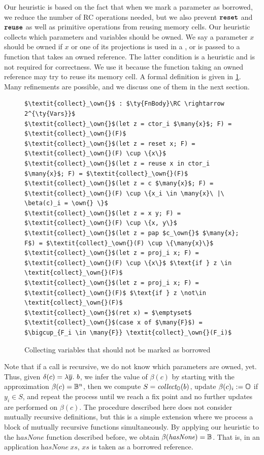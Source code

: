 Our heuristic is based on the fact that when we mark a parameter as
borrowed, we reduce the number of RC operations needed, but we
also prevent $\texttt{\textbf{reset}}$ and $\texttt{\textbf{reuse}}$ as well as primitive
operations from reusing memory cells.  Our heuristic collects which
parameters and variables should be owned.  We say a parameter $x$
should be owned if $x$ or one of its projections is used in a
, or is passed to a function that takes an owned reference.
The latter condition is a heuristic and is not required for
correctness.  We use it because the function taking an owned reference
may try to reuse its memory cell.  A formal definition is given in
\cref{fig:collect_O}. Many refinements are possible, and we
discuss one of them in the next section.
\begin{figure}
\begin{lstlisting}
$\textit{collect}_\own{}$ : $\ty{FnBody}\RC \rightarrow 2^{\ty{Vars}}$
$\textit{collect}_\own{}$(let z = ctor_i $\many{x}$; F) = $\textit{collect}_\own{}(F)$
$\textit{collect}_\own{}$(let z = reset x; F) = $\textit{collect}_\own{}(F) \cup \{x\}$
$\textit{collect}_\own{}$(let z = reuse x in ctor_i $\many{x}$; F) = $\textit{collect}_\own{}(F)$
$\textit{collect}_\own{}$(let z = c $\many{x}$; F) = $\textit{collect}_\own{}(F) \cup \{x_i \in \many{x}\ |\ \beta(c)_i = \own{} \}$
$\textit{collect}_\own{}$(let z = x y; F) = $\textit{collect}_\own{}(F) \cup \{x, y\}$
$\textit{collect}_\own{}$(let z = pap $c_\own{}$ $\many{x}; F$) = $\textit{collect}_\own{}(F) \cup \{\many{x}\}$
$\textit{collect}_\own{}$(let z = proj_i x; F) = $\textit{collect}_\own{}(F) \cup \{x\}$ $\text{if } z \in \textit{collect}_\own{}(F)$
$\textit{collect}_\own{}$(let z = proj_i x; F) = $\textit{collect}_\own{}(F)$ $\text{if } z \not\in \textit{collect}_\own{}(F)$
$\textit{collect}_\own{}$(ret x) = $\emptyset$
$\textit{collect}_\own{}$(case x of $\many{F}$) = $\bigcup_{F_i \in \many{F}} \textit{collect}_\own{}(F_i)$
\end{lstlisting}
\caption{Collecting variables that should not be marked as borrowed\label{fig:collect_O}}
\end{figure}
Note that if a call is recursive, we do not know which parameters are owned, yet. Thus, given
$\delta(c) = \lambda \overline{y}.\ b$, we infer the value of $\beta(c)$ by starting
with the approximation $\beta(c) = \mathbb{B}{}^n$, then we compute $S = \textit{collect}_{\mathbb{O}}{}(b)$,
update $\beta(c)_i := \mathbb{O}{}$ if $y_i \in S$, and
repeat the process until we reach a fix point and no further updates
are performed on $\beta(c)$. The procedure described here does not
consider mutually recursive definitions, but this is a simple
extension where we process a block of mutually recursive functions
simultaneously.
By applying our heuristic to the $\textit{hasNone}$ function described before, we obtain $\beta(\textit{hasNone}) = \mathbb{B}{}$. That is, in an application $\textit{hasNone}\ \textit{xs}$, $\textit{xs}$ is taken as a borrowed reference.

